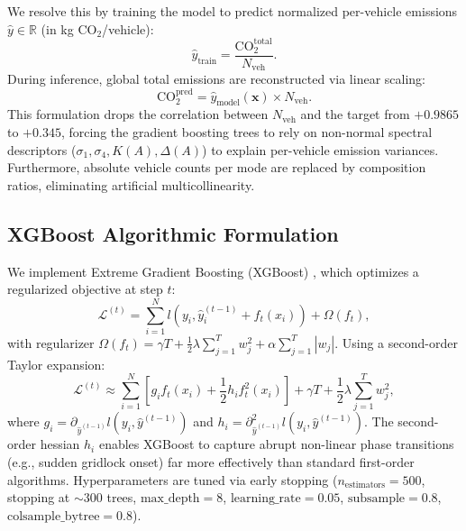 \documentclass[lettersize,journal]{IEEEtran}
\begin{document}
We resolve this by training the model to predict normalized per-vehicle emissions $\hat{y} \in \mathbb{R}$ (in kg $\text{CO}_2$/vehicle):
\begin{equation}
\hat{y}_{\text{train}} = \frac{\text{CO}_2^{\text{total}}}{N_{\text{veh}}}.
\end{equation}
During inference, global total emissions are reconstructed via linear scaling:
\begin{equation}
\text{CO}_2^{\text{pred}} = \hat{y}_{\text{model}}(\mathbf{x}) \times N_{\text{veh}}.
\end{equation}
This formulation drops the correlation between $N_{\text{veh}}$ and the target from $+0.9865$ to $+0.345$, forcing the gradient boosting trees to rely on non-normal spectral descriptors ($\sigma_1, \sigma_4, K(A), \Delta(A)$) to explain per-vehicle emission variances. Furthermore, absolute vehicle counts per mode are replaced by composition ratios, eliminating artificial multicollinearity.

\subsection{XGBoost Algorithmic Formulation}
We implement Extreme Gradient Boosting (XGBoost) \cite{Chen2016}, which optimizes a regularized objective at step $t$:
\begin{equation}
\mathcal{L}^{(t)} = \sum_{i=1}^N l\left( y_i, \hat{y}_i^{(t-1)} + f_t(x_i) \right) + \Omega(f_t),
\end{equation}
with regularizer $\Omega(f_t) = \gamma T + \frac{1}{2}\lambda \sum_{j=1}^T w_j^2 + \alpha \sum_{j=1}^T |w_j|$. Using a second-order Taylor expansion:
\begin{equation}
\mathcal{L}^{(t)} \approx \sum_{i=1}^N \left[ g_i f_t(x_i) + \frac{1}{2} h_i f_t^2(x_i) \right] + \gamma T + \frac{1}{2}\lambda \sum_{j=1}^T w_j^2,
\end{equation}
where $g_i = \partial_{\hat{y}^{(t-1)}} l(y_i, \hat{y}^{(t-1)})$ and $h_i = \partial^2_{\hat{y}^{(t-1)}} l(y_i, \hat{y}^{(t-1)})$. The second-order hessian $h_i$ enables XGBoost to capture abrupt non-linear phase transitions (e.g., sudden gridlock onset) far more effectively than standard first-order algorithms. Hyperparameters are tuned via early stopping ($n_{\text{estimators}} = 500$, stopping at $\sim 300$ trees, $\text{max\_depth} = 8$, $\text{learning\_rate} = 0.05$, $\text{subsample} = 0.8$, $\text{colsample\_bytree} = 0.8$).
\end{document}

